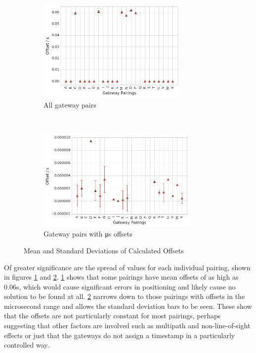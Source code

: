 \documentclass[a4paper]{report}
\begin{document}
    \begin{figure}[ht]
    \centering
    \begin{subfigure}[b]{7cm}
        \includegraphics[height=5cm]{figures/offsetsall.png}
        \caption{All gateway pairs}
        \label{fig:offsetboxesa}
    \end{subfigure}
    ~
    \begin{subfigure}[b]{7cm}
        \includegraphics[height=5cm]{figures/offsetssmall.png}
        \caption{Gateway pairs with \si{\micro\second} offsets}
        \label{fig:offsetboxesb}
    \end{subfigure}
    \caption{Mean and Standard Deviations of Calculated Offsets} \label{fig:offsetboxes}
    \end{figure}

    Of greater significance are the spread of values for each individual pairing, shown in figures \ref{fig:offsetboxesa} and \ref{fig:offsetboxesb}. \ref{fig:offsetboxesa} shows that some pairings have mean offsets of as high as 0.06s, which would cause significant errors in positioning and likely cause no solution to be found at all. \ref{fig:offsetboxesb} narrows down to those pairings with offsets in the microsecond range and allows the standard deviation bars to be seen. These show that the offsets are not particularly constant for most pairings, perhaps suggesting that other factors are involved such as multipath and non-line-of-sight effects or just that the gateways do not assign a timestamp in a particularly controlled way.
\end{document}
